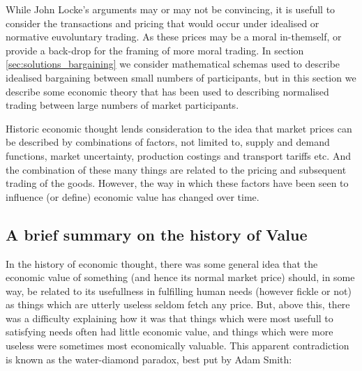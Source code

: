 While John Locke's arguments may or may not be convincing, it is usefull to consider the transactions and pricing that would occur under idealised or normative euvoluntary trading.
As these prices may be a moral in-themself, or provide a back-drop for the framing of more moral trading.
In section \ref{sec:solutions_bargaining} we consider mathematical schemas used to describe idealised bargaining between small numbers of participants, but in this section we describe some economic theory that has been used to describing normalised trading between large numbers of market participants.

Historic economic thought lends consideration to the idea that market prices can be described by combinations of factors, not limited to, supply and demand functions, market uncertainty, production costings and transport tariffs etc.
And the combination of these many things are related to the pricing and subsequent trading of the goods.
However, the way in which these factors have been seen to influence (or define) economic value has changed over time.

\subsection{A brief summary on the history of Value}

In the history of economic thought, there was some general idea that the economic value of something (and hence its normal market price) should, in some way, be related to its usefullness in fulfilling human needs (however fickle or not) as things which are utterly useless seldom fetch any price.
But, above this, there was a difficulty explaining how it was that things which were most usefull to satisfying needs often had little economic value, and things which were more useless were sometimes most economically valuable. This apparent contradiction is known as the water-diamond paradox, best put by Adam Smith:

